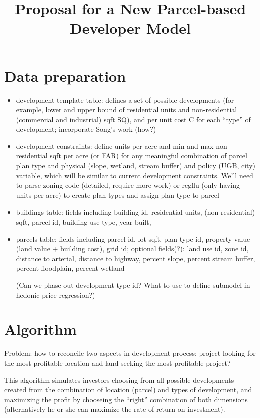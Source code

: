 \documentclass{article}
\title{Proposal for a New Parcel-based Developer Model}
\begin{document}
\maketitle
\section{Data preparation}

\begin{itemize}
\item development template table: defines a set of possible developments (for example, lower and upper bound of residential units and non-residential (commercial and industrial) sqft SQ), and per unit cost C for each ``type'' of development;  incorporate Song's work (how?)
\item development constraints: define units per acre and min and max non-residential sqft per acre (or FAR) for any meaningful combination of parcel plan type and physical (slope, wetland, stream buffer) and policy (UGB, city) variable, which will be similar to current development constraints.  We'll need to parse zoning code (detailed, require more work) or regflu (only having units per acre) to create plan types and assign plan type to parcel
\item buildings table: fields including building id, residential units, (non-residential) sqft, parcel id, building use type, year built,
\item parcels table: fields including parcel id, lot sqft, plan type id, property value (land value + building cost), grid id;
optional fields(?): land use id, zone id, distance to arterial, distance to highway, percent slope, percent stream buffer, percent floodplain, percent wetland

(Can we phase out development type id? What to use to define submodel in hedonic price regression?)

\end{itemize}

\section{Algorithm}
Problem: how to reconcile two aspects in development process: project looking for the most profitable location and land seeking the most profitable project?

This algorithm simulates investors choosing from all possible developments created from the combination of location (parcel) and types of development, and maximizing the profit by chooseing the ``right'' combination of both dimensions (alternatively he or she can maximize the rate of return on investment).
\end{document}
